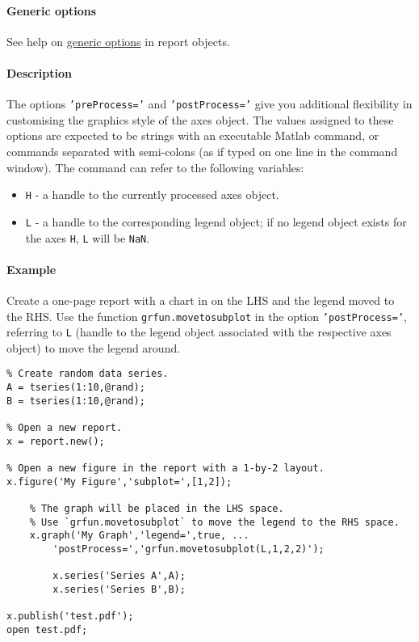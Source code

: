 \paragraph{Generic options}\label{generic-options}

See help on \href{report/Contents}{generic options} in report objects.

\paragraph{Description}\label{description}

The options \texttt{'preProcess='} and \texttt{'postProcess='} give you
additional flexibility in customising the graphics style of the axes
object. The values assigned to these options are expected to be strings
with an executable Matlab command, or commands separated with
semi-colons (as if typed on one line in the command window). The command
can refer to the following variables:

\begin{itemize}
\itemsep1pt\parskip0pt
\item
  \texttt{H} - a handle to the currently processed axes object.
\item
  \texttt{L} - a handle to the corresponding legend object; if no legend
  object exists for the axes \texttt{H}, \texttt{L} will be
  \texttt{NaN}.
\end{itemize}

\paragraph{Example}\label{example}

Create a one-page report with a chart in on the LHS and the legend moved
to the RHS. Use the function \texttt{grfun.movetosubplot} in the option
\texttt{'postProcess='}, referring to \texttt{L} (handle to the legend
object associated with the respective axes object) to move the legend
around.

\begin{verbatim}
% Create random data series.
A = tseries(1:10,@rand);
B = tseries(1:10,@rand);

% Open a new report.
x = report.new();

% Open a new figure in the report with a 1-by-2 layout.
x.figure('My Figure','subplot=',[1,2]);

    % The graph will be placed in the LHS space.
    % Use `grfun.movetosubplot` to move the legend to the RHS space.
    x.graph('My Graph','legend=',true, ...
        'postProcess=','grfun.movetosubplot(L,1,2,2)');

        x.series('Series A',A);
        x.series('Series B',B);

x.publish('test.pdf');
open test.pdf;
\end{verbatim}


